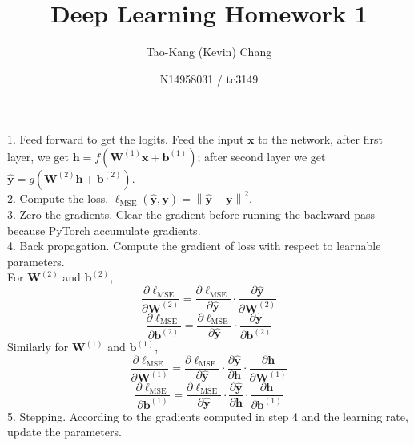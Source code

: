 \documentclass[a4paper]{article}
\title{Deep Learning Homework 1}
\author{Tao-Kang (Kevin) Chang}
\date{N14958031 / tc3149}
\newcommand\norm[1]{\left\lVert#1\right\rVert}
\begin{document}
\maketitle

\subsection{}
\subsubsection{} %
1. Feed forward to get the logits. Feed the input $\bm{x}$ to the network, after first layer, we get $\bm{h} = f(\bm{W}^{(1)}\bm{x}+\bm{b}^{(1)})$; after second layer we get $\bm{\hat{y}} = g(\bm{W}^{(2)}\bm{h}+\bm{b}^{(2)})$. \\
2. Compute the loss. $\ell_{\text{MSE}}(\bm{\hat{y}}, \bm{y}) = \norm{\bm{\hat{y}}-\bm{y}}^2$. \\
3. Zero the gradients. Clear the gradient before running the backward pass because PyTorch accumulate gradients. \\
4. Back propagation. Compute the gradient of loss with respect to learnable parameters. \\
For $\bm{W}^{(2)}$ and $\bm{b}^{(2)}$, 
$$\frac{\partial{\ell_{\text{MSE}}}}{\partial{\bm{W}^{(2)}}}=\frac{\partial{\ell_{\text{MSE}}}}{\partial{\bm{\hat{y}}}}\cdot \frac{\partial{\bm{\hat{y}}}}{\partial{\bm{W}^{(2)}}}$$
$$\frac{\partial{\ell_{\text{MSE}}}}{\partial{\bm{b}^{(2)}}}=\frac{\partial{\ell_{\text{MSE}}}}{\partial{\bm{\hat{y}}}}\cdot \frac{\partial{\bm{\hat{y}}}}{\partial{\bm{b}^{(2)}}}$$
Similarly for $\bm{W}^{(1)}$ and $\bm{b}^{(1)}$,
$$\frac{\partial{\ell_{\text{MSE}}}}{\partial{\bm{W}^{(1)}}}=\frac{\partial{\ell_{\text{MSE}}}}{\partial{\bm{\hat{y}}}}\cdot \frac{\partial{\bm{\hat{y}}}}{\partial{\bm{h}}}\cdot \frac{\partial{\bm{h}}}{\partial{\bm{W}^{(1)}}}$$
$$\frac{\partial{\ell_{\text{MSE}}}}{\partial{\bm{b}^{(1)}}}=\frac{\partial{\ell_{\text{MSE}}}}{\partial{\bm{\hat{y}}}}\cdot \frac{\partial{\bm{\hat{y}}}}{\partial{\bm{h}}}\cdot \frac{\partial{\bm{h}}}{\partial{\bm{b}^{(1)}}}$$
5. Stepping. According to the gradients computed in step 4 and the learning rate, update the parameters.
\end{document}
